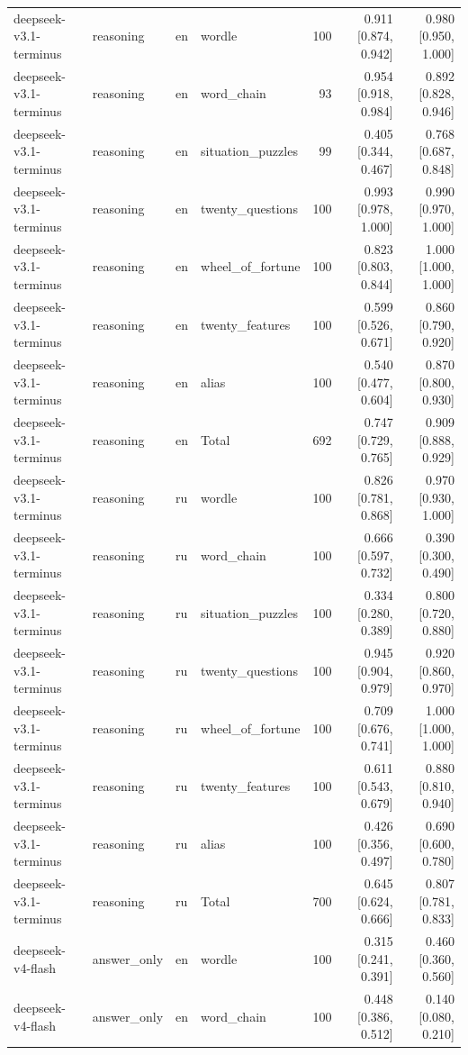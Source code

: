 \begin{longtable}{llllrrr}
deepseek-v3.1-terminus & reasoning & en & wordle & 100 & 0.911 [0.874, 0.942] & 0.980 [0.950, 1.000] \\
deepseek-v3.1-terminus & reasoning & en & word\_chain & 93 & 0.954 [0.918, 0.984] & 0.892 [0.828, 0.946] \\
deepseek-v3.1-terminus & reasoning & en & situation\_puzzles & 99 & 0.405 [0.344, 0.467] & 0.768 [0.687, 0.848] \\
deepseek-v3.1-terminus & reasoning & en & twenty\_questions & 100 & 0.993 [0.978, 1.000] & 0.990 [0.970, 1.000] \\
deepseek-v3.1-terminus & reasoning & en & wheel\_of\_fortune & 100 & 0.823 [0.803, 0.844] & 1.000 [1.000, 1.000] \\
deepseek-v3.1-terminus & reasoning & en & twenty\_features & 100 & 0.599 [0.526, 0.671] & 0.860 [0.790, 0.920] \\
deepseek-v3.1-terminus & reasoning & en & alias & 100 & 0.540 [0.477, 0.604] & 0.870 [0.800, 0.930] \\
deepseek-v3.1-terminus & reasoning & en & Total & 692 & 0.747 [0.729, 0.765] & 0.909 [0.888, 0.929] \\
deepseek-v3.1-terminus & reasoning & ru & wordle & 100 & 0.826 [0.781, 0.868] & 0.970 [0.930, 1.000] \\
deepseek-v3.1-terminus & reasoning & ru & word\_chain & 100 & 0.666 [0.597, 0.732] & 0.390 [0.300, 0.490] \\
deepseek-v3.1-terminus & reasoning & ru & situation\_puzzles & 100 & 0.334 [0.280, 0.389] & 0.800 [0.720, 0.880] \\
deepseek-v3.1-terminus & reasoning & ru & twenty\_questions & 100 & 0.945 [0.904, 0.979] & 0.920 [0.860, 0.970] \\
deepseek-v3.1-terminus & reasoning & ru & wheel\_of\_fortune & 100 & 0.709 [0.676, 0.741] & 1.000 [1.000, 1.000] \\
deepseek-v3.1-terminus & reasoning & ru & twenty\_features & 100 & 0.611 [0.543, 0.679] & 0.880 [0.810, 0.940] \\
deepseek-v3.1-terminus & reasoning & ru & alias & 100 & 0.426 [0.356, 0.497] & 0.690 [0.600, 0.780] \\
deepseek-v3.1-terminus & reasoning & ru & Total & 700 & 0.645 [0.624, 0.666] & 0.807 [0.781, 0.833] \\
deepseek-v4-flash & answer\_only & en & wordle & 100 & 0.315 [0.241, 0.391] & 0.460 [0.360, 0.560] \\
deepseek-v4-flash & answer\_only & en & word\_chain & 100 & 0.448 [0.386, 0.512] & 0.140 [0.080, 0.210] \\

\end{longtable}
